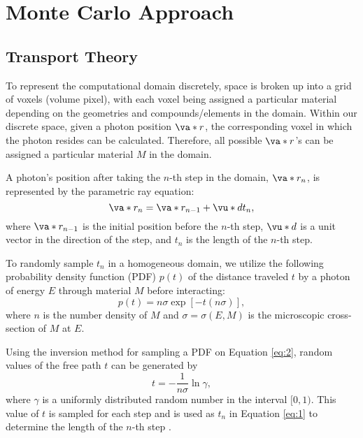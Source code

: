 \chapter{Monte Carlo Approach}

\section{Transport Theory} \label{sec:theory}
\par To represent the computational domain discretely, space is broken up into a grid of voxels (volume pixel), with each voxel being assigned a particular material depending on the geometries and compounds/elements in the domain. Within our discrete space, given a photon position $\va*{r}$, the corresponding voxel in which the photon resides can be calculated. Therefore, all possible $\va*{r}$'s can be assigned a particular material $M$ in the domain.

\par A photon's position after taking the $n$-th step in the domain, $\va*{r}_n$, is represented by the parametric ray equation:
\begin{equation} \label{eq:1}
    \va*{r}_n = \va*{r}_{n-1} + \vu*{d}t_n,
\end{equation}
where $\va*{r}_{n-1}$ is the initial position before the $n$-th step, $\vu*{d}$ is a unit vector in the direction of the step, and $t_n$ is the length of the $n$-th step.

\par To randomly sample $t_n$ in a homogeneous domain, we utilize the following probability density function (PDF) $p(t)$ of the distance traveled $t$ by a photon of energy $E$ through material $M$ before interacting:
\begin{equation} \label{eq:2}
    p(t) = n\sigma \exp\left[-t(n\sigma)\right],
\end{equation}
where $n$ is the number density of $M$ and $\sigma = \sigma(E, M)$ is the microscopic cross-section of $M$ at $E$.
\par Using the inversion method for sampling a PDF on Equation \ref{eq:2}, random values of the free path $t$ can be generated by
\begin{equation}
    t = -\frac{1}{n\sigma} \ln \gamma, 
\end{equation}
where $\gamma$ is a uniformly distributed random number in the interval $[0, 1)$. This value of $t$ is sampled for each step and is used as $t_n$ in Equation \ref{eq:1} to determine the length of the $n$-th step \cite{vassiliev_monte_2017}.


